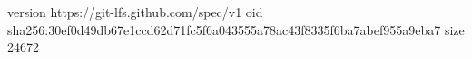 version https://git-lfs.github.com/spec/v1
oid sha256:30ef0d49db67e1ccd62d71fc5f6a043555a78ac43f8335f6ba7abef955a9eba7
size 24672
